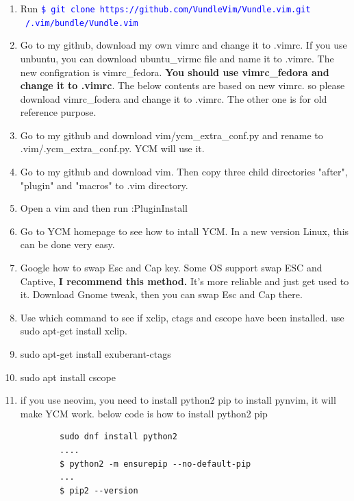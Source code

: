 \documentclass[paper=8.5in:11in, twoside, 12pt, pagesize=pdftex]{book}
\newcommand{\linuxcommand}[1]{\texttt{\textcolor{blue}{\$ #1 \Pisymbol{psy}{191}}}}
\begin{document}
\begin{enumerate}
	
	\item Run \linuxcommand{git clone https://github.com/VundleVim/Vundle.vim.git ~/.vim/bundle/Vundle.vim}
	
	\item Go to my github, download my own vimrc and change it to .vimrc. If you use unbuntu, you can download ubuntu\_virmc file and name it to .vimrc. The new configration is vimrc\_fedora. \textbf{You should use vimrc\_fedora and change it to .vimrc}.  The below contents are based on new vimrc. so please download vimrc\_fodera and change it to .vimrc. The other one is for old reference purpose.
	
	\item Go to my github and download vim/ycm\_extra\_conf.py and rename to .vim/.ycm\_extra\_conf.py. YCM will use it. 
	
	\item Go to my github and download vim. Then copy three child directories "after", "plugin" and "macros" to .vim directory.
	
	\item Open a vim and then run :PluginInstall
	
	\item Go to YCM homepage to see how to intall YCM. In a new version Linux, this can be done very easy.
	
	\item Google how to swap Esc and Cap key. Some OS support swap ESC and Captive, \textbf{I recommend this method.} It's more reliable and just get used to it. Download Gnome tweak, then you can swap Esc and Cap there.
	
	\item Use which command to see if xclip, ctags and cscope have been installed. use sudo apt-get install xclip.  
	
	\item sudo apt-get install exuberant-ctags
	
	\item sudo apt install cscope
	
	\item if you use neovim, you need to install python2 pip to install pynvim, it will make YCM work. below code is how to install python2 pip
	\begin{verbatim}
		sudo dnf install python2
		....
		$ python2 -m ensurepip --no-default-pip
		...
		$ pip2 --version
	\end{verbatim}	
	
\end{enumerate}
\end{document}
